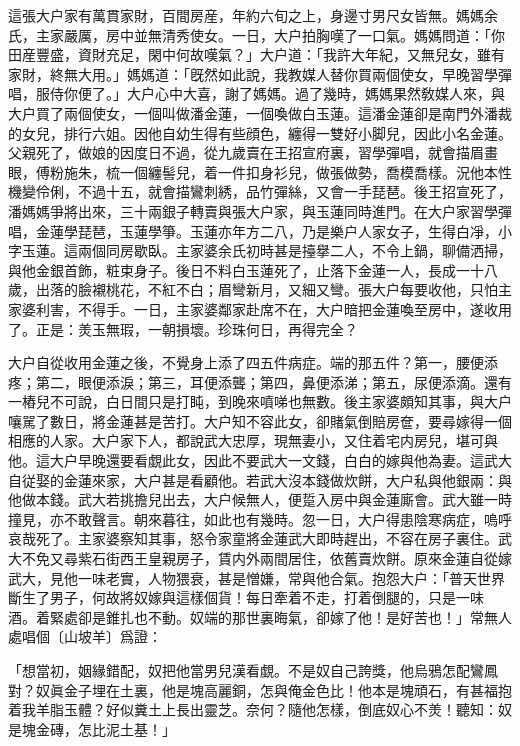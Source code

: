這張大户家有萬貫家財，百間房産，年約六旬之上，身邊寸男尺女皆無。媽媽余氏，主家嚴厲，房中並無清秀使女。一日，大户拍胸嘆了一口氣。媽媽問道：「你田産豐盛，資財充足，閑中何故嘆氣？」大户道：「我許大年紀，又無兒女，雖有家財，終無大用。」媽媽道：「旣然如此說，我教媒人替你買兩個使女，早晚習學彈唱，服侍你便了。」大户心中大喜，謝了媽媽。過了幾時，媽媽果然敎媒人來，與大户買了兩個使女，一個叫做潘金蓮，一個喚做白玉蓮。這潘金蓮卻是南門外潘裁的女兒，排行六姐。因他自幼生得有些顔色，纏得一雙好小脚兒，因此小名金蓮。父親死了，做娘的因度日不過，從九歲賣在王招宣府裏，習學彈唱，就會描眉畫眼，傅粉施朱，梳一個纏髻兒，着一件扣身衫兒，做張做勢，喬模喬樣。況他本性機變伶俐，不過十五，就會描鸞刺綉，品竹彈絲，又會一手琵琶。後王招宣死了，潘媽媽爭將出來，三十兩銀子轉賣與張大户家，與玉蓮同時進門。在大户家習學彈唱，金蓮學琵琶，玉蓮學箏。玉蓮亦年方二八，乃是樂户人家女子，生得白凈，小字玉蓮。這兩個同房歇臥。主家婆余氏初時甚是擡擧二人，不令上鍋，聊備洒掃，與他金銀首飾，粧束身子。後日不料白玉蓮死了，止落下金蓮一人，長成一十八歲，出落的臉襯桃花，不紅不白；眉彎新月，又細又彎。張大户每要收他，只怕主家婆利害，不得手。一日，主家婆鄰家赴席不在，大户暗把金蓮喚至房中，遂收用了。正是：羙玉無瑕，一朝損壞。珍珠何日，再得完全？

大户自從收用金蓮之後，不覺身上添了四五件病症。端的那五件？第一，腰便添疼；第二，眼便添淚；第三，耳便添聾；第四，鼻便添涕；第五，尿便添滴。還有一樁兒不可說，白日間只是打盹，到晚來噴㖒也無數。後主家婆頗知其事，與大户嚷駡了數日，將金蓮甚是苦打。大户知不容此女，卻賭氣倒賠房奩，要尋嫁得一個相應的人家。大户家下人，都說武大忠厚，現無妻小，又住着宅内房兒，堪可與他。這大户早晚還要看覷此女，因此不要武大一文錢，白白的嫁與他為妻。這武大自従娶的金蓮來家，大户甚是看顧他。若武大沒本錢做炊餅，大户私與他銀兩：與他做本錢。武大若挑擔兒出去，大户候無人，便踅入房中與金蓮廝會。武大雖一時撞見，亦不敢聲言。朝來暮往，如此也有幾時。忽一日，大户得患陰寒病症，嗚呼哀哉死了。主家婆察知其事，怒令家童將金蓮武大即時趕出，不容在房子裏住。武大不免又尋紫石街西王皇親房子，賃内外兩間居住，依舊賣炊餅。原來金蓮自從嫁武大，見他一味老實，人物猥衰，甚是憎嫌，常與他合氣。抱怨大户：「普天世界斷生了男子，何故將奴嫁與這樣個貨！每日牽着不走，打着倒腿的，只是一味𠳹酒。着緊處卻是錐扎也不動。奴端的那世裏晦氣，卻嫁了他！是好苦也！」常無人處唱個〔山坡羊〕爲證：

\begin{myquote}
「想當初，姻緣錯配，奴把他當男兒漢看覷。不是奴自己誇獎，他烏鴉怎配鸞鳳對？奴眞金子埋在土裏，他是塊高麗銅，怎與俺金色比！他本是塊頑石，有甚福抱着我羊脂玉體？好似糞土上長出靈芝。奈何？隨他怎樣，倒底奴心不羙！聽知：奴是塊金磚，怎比泥土基！」
\end{myquote}

